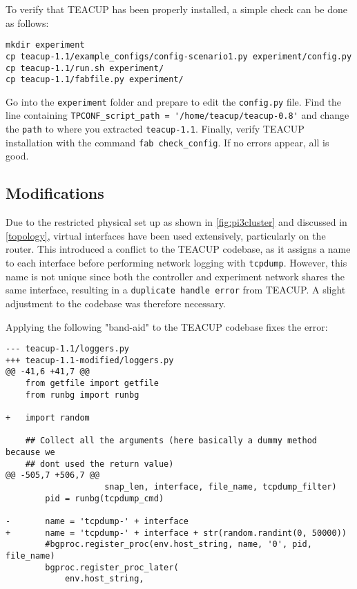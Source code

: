 To verify that TEACUP has been properly installed, a simple check can be done as follows:

\begin{lstlisting}
mkdir experiment
cp teacup-1.1/example_configs/config-scenario1.py experiment/config.py
cp teacup-1.1/run.sh experiment/
cp teacup-1.1/fabfile.py experiment/
\end{lstlisting}

Go into the \lstinline{experiment} folder and prepare to edit the \lstinline{config.py} file. Find the line containing \lstinline{TPCONF_script_path = '/home/teacup/teacup-0.8'} and change the \lstinline{path} to where you extracted \lstinline{teacup-1.1}. Finally, verify TEACUP installation with the command \lstinline{fab check_config}. If no errors appear, all is good.


\subsection{Modifications}

Due to the restricted physical set up as shown in \ref{fig:pi3cluster} and discussed in \ref{topology}, virtual interfaces have been used extensively, particularly on the router. This introduced a conflict to the TEACUP codebase, as it assigns a name to each interface before performing network logging with \lstinline{tcpdump}. However, this name is not unique since both the controller and experiment network shares the same interface, resulting in a \lstinline{duplicate handle error} from TEACUP. A slight adjustment to the codebase was therefore necessary.

Applying the following "band-aid" to the TEACUP codebase fixes the error:

\begin{lstlisting}
--- teacup-1.1/loggers.py
+++ teacup-1.1-modified/loggers.py
@@ -41,6 +41,7 @@
    from getfile import getfile
    from runbg import runbg
    
+   import random
    
    ## Collect all the arguments (here basically a dummy method because we
    ## dont used the return value)
@@ -505,7 +506,7 @@
                    snap_len, interface, file_name, tcpdump_filter)
        pid = runbg(tcpdump_cmd)
    
-       name = 'tcpdump-' + interface
+       name = 'tcpdump-' + interface + str(random.randint(0, 50000))
        #bgproc.register_proc(env.host_string, name, '0', pid, file_name)
        bgproc.register_proc_later(
            env.host_string,
\end{lstlisting}

